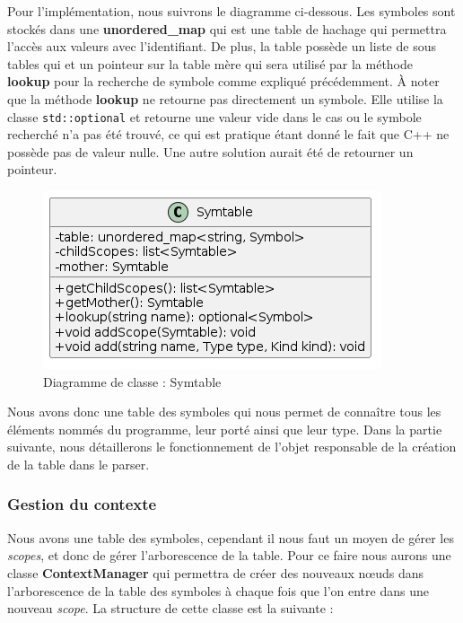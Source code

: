 \documentclass[a4paper]{article}%
\begin{document}
Pour l'implémentation, nous suivrons le diagramme ci-dessous. Les symboles sont
stockés dans une \textbf{unordered\_map} qui est une table de hachage qui
permettra l'accès aux valeurs avec l'identifiant. De plus, la table
possède un liste de sous tables qui et un pointeur sur la table mère qui sera
utilisé par la méthode \textbf{lookup} pour la recherche de symbole comme
expliqué précédemment. À noter que la méthode \textbf{lookup} ne retourne pas
directement un symbole. Elle utilise la classe \lstinline{std::optional} et
retourne une valeur vide dans le cas ou le symbole recherché n'a pas été trouvé,
ce qui est pratique étant donné le fait que C++ ne possède pas de valeur nulle.
Une autre solution aurait été de retourner un pointeur.

\begin{figure}[h!]
  \begin{center}
  \includegraphics[scale=0.5]{../ressources/diagrams/symtable2.png}
  \caption{Diagramme de classe : Symtable}
  \end{center}
\end{figure}

Nous avons donc une table des symboles qui nous permet de connaître tous les
éléments nommés du programme, leur porté ainsi que leur type. Dans la partie
suivante, nous détaillerons le fonctionnement de l'objet responsable de la
création de la table dans le \gls{parser}.

\clearpage
\subsubsection*{Gestion du contexte}

Nous avons une table des symboles, cependant il nous faut un moyen de gérer les
\textit{scopes}, et donc de gérer l'arborescence de la table. Pour ce faire nous
aurons une classe \textbf{ContextManager} qui permettra de créer des nouveaux
nœuds dans l'arborescence de la table des symboles à chaque fois que l'on entre
dans une nouveau \textit{scope}. La structure de cette classe est la suivante :
\end{document}
